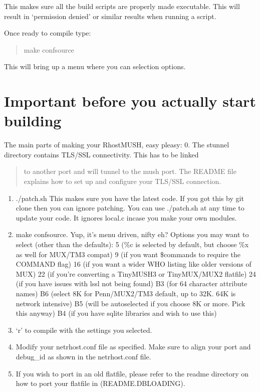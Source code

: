 \documentclass[letterpaper,10pt,english]{sphinxmanual}
\begin{document}
\sphinxAtStartPar
This makes sure all the build scripts are properly made executable.
This will result in ‘permission denied’ or similar results when running a script.

\sphinxAtStartPar
Once ready to compile type:
\begin{quote}

\sphinxAtStartPar
make confsource
\end{quote}

\sphinxAtStartPar
This will bring up a menu where you can selection options.


\section{Important before you actually start building}
\label{\detokenize{24-quickinstall:important-before-you-actually-start-building}}
\sphinxAtStartPar
The main parts of making your RhostMUSH, easy pleasy:
0.  The stunnel directory contains TLS/SSL connectivity.  This has to be linked
\begin{quote}

\sphinxAtStartPar
to another port and will tunnel to the mush port.  The README file explains
how to set up and configure your TLS/SSL connection.
\end{quote}
\begin{enumerate}
%
\item {} 
\sphinxAtStartPar
./patch.sh \textendash{} This makes sure you have the latest code.
If you got this by git clone 
then you can ignore patching.  You can use ./patch.sh at any
time to update your code.  It ignores local.c incase you make
your own modules.

\item {} 
\sphinxAtStartPar
make confsource.  Yup, it’s menu driven, nifty eh?
Options you may want to select (other than the defaults):
5  (\%c is selected by default, but choose \%x as well for MUX/TM3 compat)
9  (if you want \$commands to require the COMMAND flag)
16 (if you want a wider WHO listing like older versions of MUX)
22 (if you’re converting a TinyMUSH3 or TinyMUX/MUX2 flatfile)
24 (if you have issues with \sphinxhyphen{}lssl not being found)
B3 (for 64 character attribute names)
B6 (select 8K for Penn/MUX2/TM3 default, up to 32K.  64K is network intensive)
B5 (will be autoselected if you choose 8K or more.  Pick this anyway)
B4 (if you have sqlite libraries and wish to use this)

\item {} 
\sphinxAtStartPar
‘r’ to compile with the settings you selected.

\item {} 
\sphinxAtStartPar
Modify your netrhost.conf file as specified.  Make sure to align
your port and debug\_id as shown in the netrhost.conf file.

\item {} 
\sphinxAtStartPar
If you wish to port in an old flatfile, please refer to the readme directory
on how to port your flatfile in (README.DBLOADING).

\end{enumerate}
\end{document}
